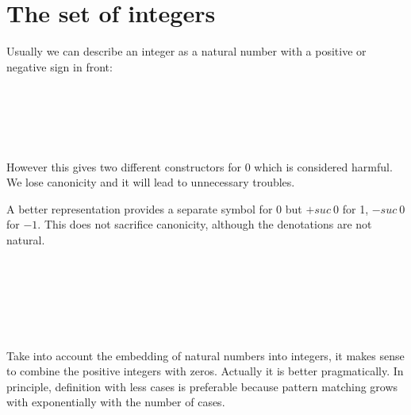 \section{The set of integers}

Usually we can describe an integer as a natural number with a positive
or negative sign in front: 

\begin{code}
\\
\>  \AgdaSymbol{:}  \<%
\\
\>[0]\<[2]%
\>[2]\AgdaInductiveConstructor{+\_} \AgdaSymbol{:}   \<%
\\
\>[0]\<[2]%
\>[2]\AgdaInductiveConstructor{-\_} \AgdaSymbol{:}   \<%
\\
\end{code}

However this gives two different constructors for 0 which is
considered harmful. We lose canonicity and it will lead to unnecessary troubles.

A better representation provides a separate symbol for 0 but $+suc~
0$ for 1, $-suc ~0$ for $- 1$. This does not sacrifice canonicity,
although the denotations are not natural.

\begin{code}%
\\
\>  \AgdaSymbol{:}  \<%
\\
\>[0]\<[2]%
\>[2] \AgdaSymbol{:}   \<%
\\
\>[0]\<[2]%
\>[2] \<[8]%
\>[8]\AgdaSymbol{:} \<%
\\
\>[0]\<[2]%
\>[2] \AgdaSymbol{:}   \<%
\\
\>\<\end{code}

Take into account the embedding of natural numbers into integers, it
makes sense to combine the positive integers with zeros. Actually it is
better pragmatically. In principle, definition with less
cases is preferable because pattern matching grows with exponentially
with the number of cases.

